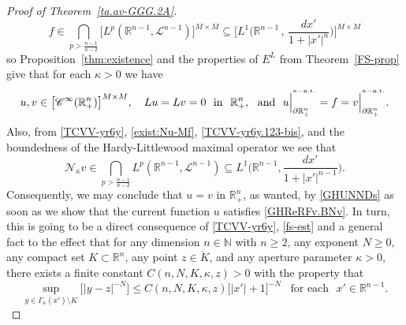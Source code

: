 \documentclass[11pt,reqno]{amsart}
\numberwithin{equation}{section}
\theoremstyle{remark}
\begin{document}
\begin{proof}[Proof of Theorem~\ref{ta.av-GGG.2A}]
\begin{equation}
f\in\bigcap_{p>\frac{n-1}{n-2}}\big[L^p({\mathbb{R}}^{n-1},{\mathcal{L}}^{n-1})\big]^{M\times M}
\subseteq\Big[L^1\Big({\mathbb{R}}^{n-1}\,,\,\frac{dx'}{1+|x'|^{n}}\Big)\Big]^{M\times M}
\end{equation}
%
so Proposition~\ref{thm:existence} and the properties of $E^L$ from Theorem~\ref{FS-prop} give that for each $\kappa>0$ we have
%
\begin{equation}\label{TCVV-yr6y.2}
u,v\in\big[{\mathscr{C}}^\infty({\mathbb{R}}^n_{+})\big]^{M\times M},\quad
Lu=Lv=0\,\,\text{ in }\,\,{\mathbb{R}}^n_{+},\,\,\text{ and }\,\,
u\Big|^{{}^{\kappa-{\rm n.t.}}}_{\partial{\mathbb{R}}^n_{+}}=f
=v\Big|^{{}^{\kappa-{\rm n.t.}}}_{\partial{\mathbb{R}}^n_{+}}.
\end{equation}
%
Also, from \eqref{TCVV-yr6y}, \eqref{exist:Nu-Mf}, \eqref{TCVV-yr6y.123-bis}, and the boundedness of the Hardy-Littlewood maximal operator 
we see that 
%
\begin{equation}\label{pauha.2}
{\mathcal{N}}_\kappa v\in\bigcap_{p>\frac{n-1}{n-2}}L^p({\mathbb{R}}^{n-1},{\mathcal{L}}^{n-1})
\subseteq L^1\Big({\mathbb{R}}^{n-1},\frac{dx'}{1+|x'|^{n-1}}\Big).
\end{equation}
%
Consequently, we may conclude that $u=v$ in ${\mathbb{R}}^n_{+}$, as wanted, by \eqref{GHUNNDs} 
as soon as we show that the current function $u$ satisfies \eqref{GHReRFv.BNv}. In turn, this is going to be a direct consequence of \eqref{TCVV-yr6y},
\eqref{fs-est} and a general fact to the effect that for any dimension $n\in{\mathbb{N}}$ with $n\geq 2$, any exponent $N\geq 0$, 
any compact set $K\subset{\mathbb{R}}^n$, any point $z\in\mathring{K}$, and any aperture parameter $\kappa>0$, 
there exists a finite constant $C(n,N,K,\kappa,z)>0$ with the property that 
%
\begin{equation}\label{UUNNpkjgr}
\sup_{y\in\Gamma_\kappa(x')\setminus K}\Big[|y-z|^{-N}\Big]\leq C(n,N,K,\kappa,z)
\big[|x'|+1\big]^{-N}\,\,\,\text{ for each }\,\,x'\in{\mathbb{R}}^{n-1}.
\end{equation}


\end{proof}
\end{document}
